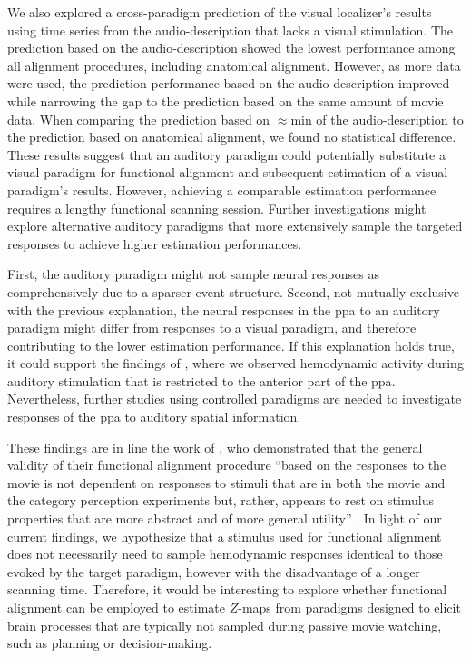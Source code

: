 %
We also explored a cross-paradigm prediction of the visual localizer's results
using time series from the audio-description that lacks a visual stimulation.
%
The prediction based on the audio-description showed the lowest performance
among all alignment procedures, including anatomical alignment.
%
However, as more data were used, the prediction performance based on the
audio-description improved while narrowing the gap to the prediction based on
the same amount of movie data.
%
When comparing the prediction based on $\approx$\unit[120]{min} of the
audio-description to the prediction based on anatomical alignment, we found no
statistical difference.
%
These results suggest that an auditory paradigm could potentially substitute a
visual paradigm for functional alignment and subsequent estimation of a visual
paradigm's results.
%
However, achieving a comparable estimation performance requires a lengthy
functional scanning session.
%
Further investigations might explore alternative auditory paradigms that more
extensively sample the targeted responses to achieve higher estimation
performances.

%
First, the auditory paradigm might not sample neural responses as
comprehensively due to a sparser event structure.
%
Second, not mutually exclusive with the previous explanation, the neural
responses in the \ac{ppa} to an auditory paradigm might differ from responses to
a visual paradigm, and therefore contributing to the lower estimation
performance.
%
If this explanation holds true, it could support the findings of
\citet{haeusler2022processing}, where we observed hemodynamic activity during
auditory stimulation that is restricted to the anterior part of the \ac{ppa}.
%
Nevertheless, further studies using controlled paradigms are needed to
investigate responses of the \ac{ppa} to auditory spatial information.


%
These findings are in line the work of \citet{haxby2011common}, who demonstrated
that the general validity of their functional alignment procedure ``based on the
responses to the movie is not dependent on responses to stimuli that are in both
the movie and the category perception experiments but, rather, appears to rest
on stimulus properties that are more abstract and of more general utility''
\citep[][p. 409]{haxby2011common}.
%
In light of our current findings, we hypothesize that a stimulus used for
functional alignment does not necessarily need to sample hemodynamic responses
identical to those evoked by the target paradigm, however with the disadvantage
of a longer scanning time.
%
Therefore, it would be interesting to explore whether functional alignment can
be employed to estimate $Z$-maps from paradigms designed to elicit brain
processes that are typically not sampled during passive movie watching, such as
planning or decision-making.



